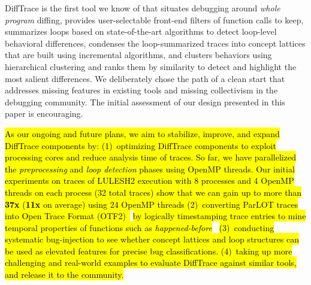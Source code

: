 DiffTrace is the first tool we know of that situates debugging around {\em whole program}
diffing, provides user-selectable front-end filters of function calls to keep,
summarizes loops based on state-of-the-art algorithms to detect loop-level
behavioral differences,
condenses the loop-summarized
traces into concept lattices that are built using incremental
algorithms, and clusters behaviors using hierarchical clustering and ranks them by similarity to detect and highlight the most salient differences.
We deliberately chose the path of a clean start that addresses missing features
in existing tools and missing collectivism in the debugging community.
%
The initial assessment of our design presented in this paper is encouraging.
%

\hl{
As our ongoing and future plans, we aim to stabilize, improve, and expand DiffTrace components by: 
%
(1)~optimizing DiffTrace components to exploit processing cores and reduce analysis time of traces. 
%
So far, we have parallelized the \textit{preprocessing} and \textit{loop detection} phases using OpenMP threads. 
%
Our initial experiments on traces of LULESH2 execution with 8 processes and 4 OpenMP threads on each process (32 total traces) show that we can gain up to more than \textbf{37x} (\textbf{11x} on average) using 24 OpenMP threads
%
(2)~converting ParLOT traces into Open Trace Format (OTF2)~}\cite{otf2} \hl{by logically timestamping trace entries to mine temporal properties of functions such as \textit{happened-before}}~\cite{lamport}\hl{
%
(3)~conducting systematic bug-injection to see whether concept lattices and loop structures can be used as elevated features for precise bug classifications.
%
(4)~taking up more challenging and real-world examples to evaluate DiffTrace against similar tools, and release it to the community.
}

